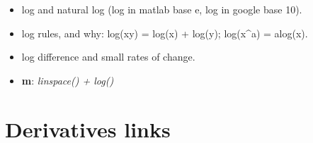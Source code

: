 \documentclass[
]{book}
\providecommand{\tightlist}{%
  \setlength{\itemsep}{0pt}\setlength{\parskip}{0pt}}
\begin{document}
\begin{enumerate}
  \begin{itemize}
  \tightlist
  \item
    log and natural log (log in matlab base e, log in google base 10).
  \item
    log rules, and why: log(xy) = log(x) + log(y); log(x\^{}a) = alog(x).
  \item
    log difference and small rates of change.
  \item
    \textbf{m}: \emph{linspace() + log()}
  \end{itemize}
\end{enumerate}

\hypertarget{derivatives-links}{%
\section{Derivatives links}\label{derivatives-links}}
\end{document}
